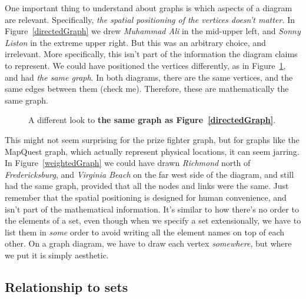 One important thing to understand about graphs is which aspects of a
diagram are relevant. Specifically, \textit{the spatial positioning of the
vertices doesn't matter.} In Figure~\ref{directedGraph} we drew
\textsl{Muhammad Ali} in the mid-upper left, and \textsl{Sonny Liston}  in
the extreme upper right. But this was an arbitrary choice, and irrelevant.
More specifically, this isn't part of the information the diagram claims to
represent. We could have positioned the vertices differently, as in
Figure~\ref{directedGraphDiff}, and had \textit{the same graph}. In both
diagrams, there are the same vertices, and the same edges between them
(check me). Therefore, these are mathematically the same graph.

\begin{figure}[ht]
\centering

\caption{A different look to \textbf{the same graph as
Figure~\ref{directedGraph}}.}
\label{directedGraphDiff}
\end{figure}

This might not seem surprising for the prize fighter graph, but for graphs
like the MapQuest graph, which actually represent physical locations, it
can seem jarring. In Figure~\ref{weightedGraph} we could have drawn
\textsl{Richmond} north of \textsl{Fredericksburg}, and \textsl{Virginia
Beach} on the far west side of the diagram, and still had the same graph,
provided that all the nodes and links were the same. Just remember that the
spatial positioning is designed for human convenience, and isn't part of
the mathematical information. It's similar to how there's no order to the
elements of a set, even though when we specify a set extensionally, we have
to list them in \textit{some} order to avoid writing all the element names
on top of each other. On a graph diagram, we have to draw each vertex
\textit{somewhere}, but where we put it is simply aesthetic.


\subsection{Relationship to sets}

